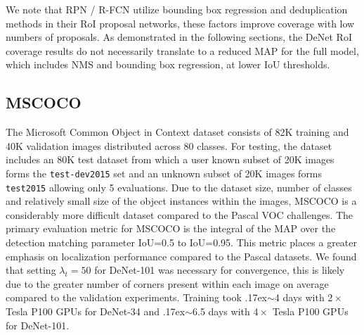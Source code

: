 \documentclass[10pt,twocolumn]{article}
\newcommand\approxtilde{\raise.17ex\hbox{$\scriptstyle\sim$}}
\begin{document}
We note that RPN / R-FCN utilize bounding box regression and deduplication methods in their RoI proposal networks, these factors improve coverage with low numbers of proposals. As demonstrated in the following sections, the DeNet RoI coverage results do not necessarily translate to a reduced MAP for the full model, which includes NMS and bounding box regression, at lower IoU thresholds.  

\subsection{MSCOCO} The Microsoft Common Object in Context\cite{mscoco} dataset consists of 82K training and 40K validation images distributed across 80 classes. For testing, the dataset includes an 80K test dataset from which a user known subset of 20K images forms the \texttt{test-dev2015} set and an unknown subset of 20K images forms \texttt{test2015} allowing only 5 evaluations. Due to the dataset size, number of classes and relatively small size of the object instances within the images, MSCOCO is a considerably more difficult dataset compared to the Pascal VOC challenges. The primary evaluation metric for MSCOCO is the integral of the MAP over the detection matching parameter IoU=0.5 to IoU=0.95. This metric places a greater emphasis on localization performance compared to the Pascal datasets. We found that setting $\lambda_t = 50$ for DeNet-101 was necessary for convergence, this is likely due to the greater number of corners present within each image on average compared to the validation experiments. Training took \approxtilde 4 days with $2\times$ Tesla P100 GPUs for DeNet-34 and \approxtilde 6.5 days with $4\times$ Tesla P100 GPUs for DeNet-101.
\end{document}
